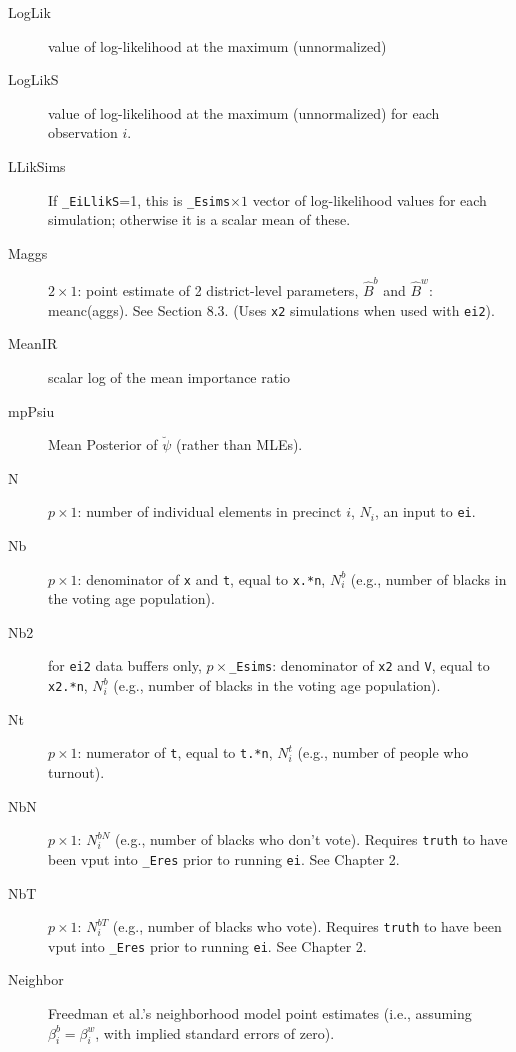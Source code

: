 \documentclass[11pt,titlepage]{article}
\newcommand{\psiu}{\breve{\psi}}
\newcommand{\NbN}{{N_i^{bN}}}
\newcommand{\Nbp}{{N_i^{b}}}
\newcommand{\Npp}{{N_i}}
\newcommand{\NbV}{{N_i^{bT}}}       %
\begin{document}
\begin{description}
\item[LogLik] value of log-likelihood at the maximum (unnormalized)

\item[LogLikS] value of log-likelihood at the maximum (unnormalized)
  for each observation $i$.

\item[LLikSims] If \texttt{\_EiLlikS}=1, this is \texttt{\_Esims}$\times
  1$ vector of log-likelihood values for each simulation; otherwise it
  is a scalar mean of these.

\item[Maggs] $2\times 1$: point estimate of 2 district-level
  parameters, $\hat{B}^b$ and $\hat{B}^w$: meanc(aggs).  See Section
  8.3.  (Uses \texttt{x2} simulations when used with \texttt{ei2}).

\item[MeanIR] scalar log of the mean importance ratio

\item[mpPsiu] Mean Posterior of $\psiu$ (rather than MLEs).

\item[N] $p\times 1$: number of individual elements in precinct $i$,
  $\Npp$, an input to \texttt{ei}.

\item[Nb] $p\times 1$: denominator of \texttt{x} and \texttt{t},
  equal to \texttt{x.*n}, $\Nbp$ (e.g., number of blacks in the
  voting age population).

\item[Nb2] for \texttt{ei2} data buffers only,
  $p\times$\texttt{\_Esims}: denominator of \texttt{x2} and
  \texttt{V}, equal to \texttt{x2.*n}, $\Nbp$ (e.g., number of blacks
  in the voting age population).

\item[Nt] $p\times 1$: numerator of \texttt{t}, equal to
  \texttt{t.*n}, $N^t_i$ (e.g., number of people who turnout).

\item[NbN] $p\times1$: $\NbN$ (e.g., number of blacks who don't vote).
  Requires \texttt{truth} to have been vput into \texttt{\_Eres} prior
  to running \texttt{ei}.  See Chapter 2.

\item[NbT] $p\times1$: $\NbV$ (e.g., number of blacks who vote).
  Requires \texttt{truth} to have been vput into \texttt{\_Eres} prior
  to running \texttt{ei}. See Chapter 2.

\item[Neighbor] Freedman et al.'s neighborhood model point estimates
  (i.e., assuming $\beta_i^b=\beta_i^w$, with implied standard errors
  of zero).


\end{description}
\end{document}
